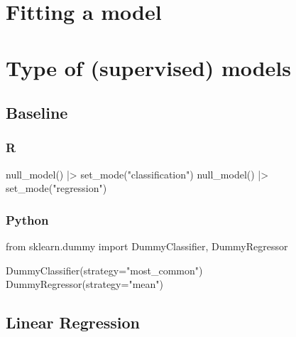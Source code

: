 \documentclass[
  letterpaper,
  DIV=11,
  numbers=noendperiod]{scrreprt}
\newenvironment{Shaded}{\begin{snugshade}}{\end{snugshade}}
\newcommand{\FunctionTok}[1]{\textcolor[rgb]{0.28,0.35,0.67}{#1}}
\newcommand{\ImportTok}[1]{\textcolor[rgb]{0.00,0.46,0.62}{#1}}
\newcommand{\NormalTok}[1]{\textcolor[rgb]{0.00,0.46,0.62}{#1}}
\newcommand{\OperatorTok}[1]{\textcolor[rgb]{0.37,0.37,0.37}{#1}}
\newcommand{\SpecialCharTok}[1]{\textcolor[rgb]{0.37,0.37,0.37}{#1}}
\newcommand{\StringTok}[1]{\textcolor[rgb]{0.13,0.47,0.30}{#1}}
\begin{document}
\hypertarget{fitting-a-model-1}{%
\section{Fitting a model}\label{fitting-a-model-1}}

\hypertarget{type-of-supervised-models}{%
\section{Type of (supervised) models}\label{type-of-supervised-models}}

\hypertarget{baseline}{%
\subsection{Baseline}\label{baseline}}

\hypertarget{r-71}{%
\subsubsection{R}\label{r-71}}

\begin{Shaded}
\begin{Highlighting}[]
\FunctionTok{null\_model}\NormalTok{() }\SpecialCharTok{|\textgreater{}} \FunctionTok{set\_mode}\NormalTok{(}\StringTok{"classification"}\NormalTok{)}
\FunctionTok{null\_model}\NormalTok{() }\SpecialCharTok{|\textgreater{}} \FunctionTok{set\_mode}\NormalTok{(}\StringTok{"regression"}\NormalTok{)}
\end{Highlighting}
\end{Shaded}

\hypertarget{python-71}{%
\subsubsection{Python}\label{python-71}}

\begin{Shaded}
\begin{Highlighting}[]
\ImportTok{from}\NormalTok{ sklearn.dummy }\ImportTok{import}\NormalTok{ DummyClassifier, DummyRegressor}

\NormalTok{DummyClassifier(strategy}\OperatorTok{=}\StringTok{"most\_common"}\NormalTok{)}
\NormalTok{DummyRegressor(strategy}\OperatorTok{=}\StringTok{"mean"}\NormalTok{)}
\end{Highlighting}
\end{Shaded}

\hypertarget{linear-regression}{%
\subsection{Linear Regression}\label{linear-regression}}
\end{document}
